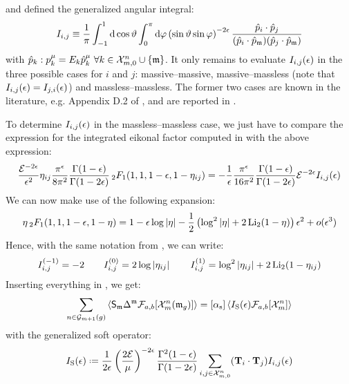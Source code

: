 and defined the generalized angular integral:
\begin{equation}
  I_{i,j} \equiv \frac{1}{\pi} \int_{-1}^1 \mathrm{d} \cos \vartheta \int_0^\pi \mathrm{d} \varphi \left( \sin \vartheta \sin \varphi \right)^{-2\epsilon} \frac{\hat{p}_i \cdot \hat{p}_j}{(\hat{p}_i \cdot \hat{p}_{\mathfrak{m}}) (\hat{p}_j \cdot \hat{p}_{\mathfrak{m}})}
  \label{eq:gen-int}
\end{equation}
with $ \hat{p}_k : p_k^\mu = E_k \hat{p}_k^\mu \,\,\forall k \in \mathcal{X}^{n}_{m,0}\cup\{\mathfrak{m}\} $. It only remains to evaluate $ I_{i,j}(\epsilon) $ in the three possible cases for $ i $ and $ j $: massive--massive, massive--massless (note that $ I_{i,j}(\epsilon) = I_{j,i}(\epsilon) $) and massless--massless. The former two cases are known in the literature, e.g. Appendix D.2 of \cite{Behring-2020}, and are reported in .

To determine $ I_{i,j}(\epsilon) $ in the massless--massless case, we just have to compare the expression for the integrated eikonal factor computed in  with the above expression:
\begin{equation*}
  \frac{\mathcal{E}^{-2\epsilon}}{\epsilon^2} \eta_{ij} \frac{\pi^\epsilon}{8\pi^2} \frac{\Gamma(1-\epsilon)}{\Gamma(1-2\epsilon)} \,{_2F_1}(1,1,1-\epsilon,1-\eta_{ij}) = - \frac{1}{\epsilon} \frac{\pi^\epsilon}{16\pi^2} \frac{\Gamma(1-\epsilon)}{\Gamma(1-2\epsilon)} \mathcal{E}^{-2\epsilon} I_{i,j}(\epsilon)
\end{equation*}
We can now make use of the following expansion:
\begin{equation}
  \eta \,{_2F_1}(1,1,1-\epsilon,1-\eta) = 1 - \epsilon \log \left\lvert\eta\right\rvert - \frac{1}{2} \left( \log^2 \left\lvert\eta\right\rvert + 2 \operatorname{Li_2}(1-\eta) \right) \epsilon^2 + o(\epsilon^3)
\end{equation}
Hence, with the same notation from , we can write:
\begin{equation}
  I_{i,j}^{(-1)} = - 2
  \qquad
  I_{i,j}^{(0)} = 2 \log \left\lvert\eta_{ij}\right\rvert
  \qquad
  I_{i,j}^{(1)} = \log^2 \left\lvert\eta_{ij}\right\rvert + 2 \operatorname{Li_2}(1 - \eta_{ij})
  \label{eq:i-nmnm}
\end{equation}
Inserting everything in , we get:
\begin{equation}
  \sum_{n \in \mathcal{G}_{m+1}(g)} \left\langle \mathsf{S}_{\mathfrak{m}} \Delta^{\mathfrak{m}} \mathcal{F}_{a,b}[\mathcal{X}^{n}_{m}(\mathfrak{m}_g)] \right\rangle = [\alpha_\text{s}] \left\langle I_\text{S}(\epsilon) \mathcal{F}_{a,b}[\mathcal{X}^{n}_{m}] \right\rangle
\end{equation}
with the generalized soft operator:
\begin{equation}
  \iso(\de) \defeq \frac{1}{2\de} \left( \frac{2\ema}{\mu} \right)^{-2\de} \frac{\Gamma^2(1-\de)}{\Gamma(1-2\de)} \sum_{i,j \in \fsp{n}{m}} (\cc) \eit_{i,j}(\de)
  \label{eq:iso-gen}
\end{equation}

